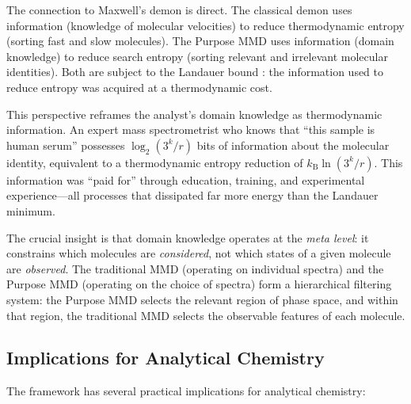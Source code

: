 \documentclass[11pt,twocolumn,a4paper]{article}
\theoremstyle{definition}
\theoremstyle{remark}
\newcommand{\kB}{k_{\mathrm{B}}}
\begin{document}
The connection to Maxwell's demon \citep{maxwell1871} is direct. The classical demon uses information (knowledge of molecular velocities) to reduce thermodynamic entropy (sorting fast and slow molecules). The Purpose MMD uses information (domain knowledge) to reduce search entropy (sorting relevant and irrelevant molecular identities). Both are subject to the Landauer bound \citep{landauer1961}: the information used to reduce entropy was acquired at a thermodynamic cost.

This perspective reframes the analyst's domain knowledge as thermodynamic information. An expert mass spectrometrist who knows that ``this sample is human serum'' possesses $\log_2(3^k / r)$ bits of information about the molecular identity, equivalent to a thermodynamic entropy reduction of $\kB \ln(3^k / r)$. This information was ``paid for'' through education, training, and experimental experience---all processes that dissipated far more energy than the Landauer minimum.

The crucial insight is that domain knowledge operates at the \emph{meta level}: it constrains which molecules are \emph{considered}, not which states of a given molecule are \emph{observed}. The traditional MMD (operating on individual spectra) and the Purpose MMD (operating on the choice of spectra) form a hierarchical filtering system: the Purpose MMD selects the relevant region of phase space, and within that region, the traditional MMD selects the observable features of each molecule.

\subsection{Implications for Analytical Chemistry}\label{sec:implications}

The framework has several practical implications for analytical chemistry:
\end{document}
